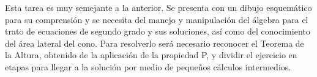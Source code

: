 		
		Esta tarea es muy semejante a la anterior. Se presenta con un dibujo esquemático para su comprensión y se necesita del manejo y manipulación del álgebra para el trato de ecuaciones de segundo grado y sus soluciones, así como del conocimiento del área lateral del cono. Para resolverlo será necesario reconocer el Teorema de la Altura, obtenido de la aplicación de la propiedad P, y dividir el ejercicio en etapas para llegar a la solución por medio de pequeños cálculos intermedios.
		
